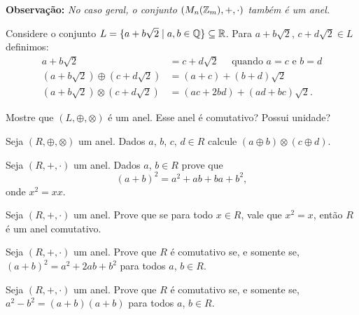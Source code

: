 \documentclass[12pt]{exam}
\begin{document}
    \vspace{.2cm}

    \textbf{Observação: }\textit{No caso geral, o conjunto $(M_n(\mathbb{Z}_m), + , \cdot)$ também é um anel.}

    \vspace{.4cm}

    \questao{} Considere o conjunto $L = \{ a + b\sqrt{2} \mid a, b \in \mathbb{Q}\} \subseteq \mathbb{R}$. Para $a + b\sqrt{2}$, $c + d\sqrt{2} \in L$ definimos:
    \begin{align*}
        a + b\sqrt{2} &= c + d\sqrt{2} \quad \mbox{ quando } a = c \mbox{ e } b = d\\
        (a + b\sqrt{2}) \oplus (c + d\sqrt{2}) &= (a + c) + (b + d)\sqrt{2}\\
        (a + b\sqrt{2}) \otimes (c + d\sqrt{2}) &= (ac + 2bd) + (ad + bc)\sqrt{2}.
    \end{align*}

    Mostre que $(L, \oplus, \otimes)$ \'e um anel. Esse anel \'e comutativo? Possui unidade?

    \vspace{.3cm}

    \questao{} Seja $(R, \oplus, \otimes)$ um anel. Dados $a$, $b$, $c$, $d \in R$ calcule $(a \oplus b)\otimes (c \oplus d)$.

    \vspace{.3cm}

    \questao{} Seja $(R, +, \cdot)$ um anel. Dados $a$, $b \in R$ prove que
    \[
        (a + b)^2 = a^2 + ab + ba + b^2,
    \]
    onde $x^2 = xx$.

    \vspace{.3cm}

    \questao{} Seja $(R, +, \cdot)$ um anel. Prove que se para todo $x \in R$, vale que $x^2 = x$, então $R$ é um anel comutativo.

    \vspace{.3cm}

    \questao{} Seja $(R, +, \cdot)$ um anel. Prove que $R$ é comutativo se, e somente se, $(a + b)^2 = a^2 + 2ab + b^2$ para todos $a$, $b \in R$.

    \vspace{.3cm}

    \questao{} Seja $(R, +, \cdot)$ um anel. Prove que $R$ é comutativo se, e somente se, $a^2 - b^2 = (a + b)(a + b)$ para todos $a$, $b \in R$.

    \vspace{.3cm}
\end{document}
